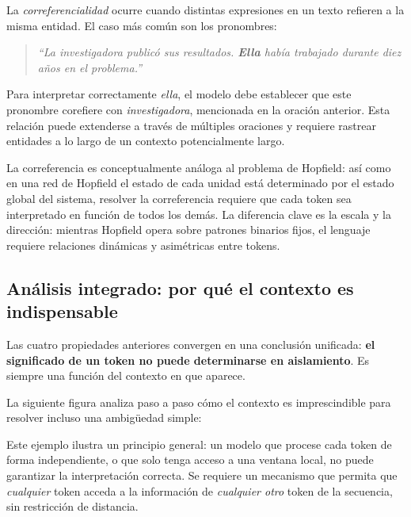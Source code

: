 La \textit{correferencialidad} ocurre cuando distintas expresiones en un
texto refieren a la misma entidad. El caso más común son los pronombres:

\begin{quote}
\textit{``La investigadora publicó sus resultados. \textbf{Ella} había
trabajado durante diez años en el problema.''}
\end{quote}

Para interpretar correctamente \textit{ella}, el modelo debe establecer que
este pronombre corefiere con \textit{investigadora}, mencionada en la oración
anterior. Esta relación puede extenderse a través de múltiples oraciones y
requiere rastrear entidades a lo largo de un contexto potencialmente largo.

La correferencia es conceptualmente análoga al problema de Hopfield: así
como en una red de Hopfield el estado de cada unidad está determinado por el
estado global del sistema, resolver la correferencia requiere que cada token
sea interpretado en función de todos los demás. La diferencia clave es la
escala y la dirección: mientras Hopfield opera sobre patrones binarios fijos,
el lenguaje requiere relaciones dinámicas y asimétricas entre tokens.

\subsection{Análisis integrado: por qué el contexto es indispensable}
\label{subsec:contexto_indispensable}

Las cuatro propiedades anteriores convergen en una conclusión unificada:
\textbf{el significado de un token no puede determinarse en aislamiento}. Es
siempre una función del contexto en que aparece.

La siguiente figura analiza paso a paso cómo el contexto es imprescindible
para resolver incluso una ambigüedad simple:



Este ejemplo ilustra un principio general: un modelo que procese cada token
de forma independiente, o que solo tenga acceso a una ventana local, no puede
garantizar la interpretación correcta. Se requiere un mecanismo que permita
que \textit{cualquier} token acceda a la información de \textit{cualquier
otro} token de la secuencia, sin restricción de distancia.

